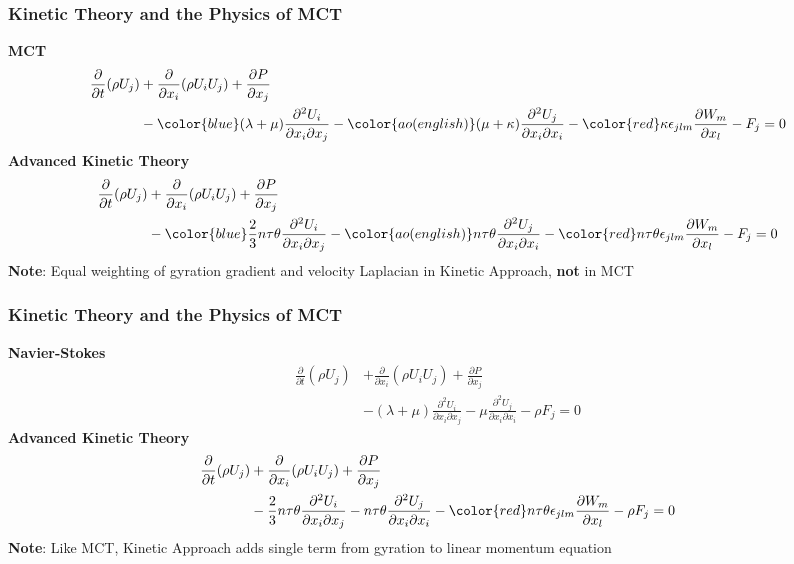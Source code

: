\documentclass{beamer}
\begin{document}
\begin{frame}
 \frametitle{Kinetic Theory and the Physics of MCT}
 \textbf{MCT}
 \begin{align*}
\frac{\partial}{\partial t}(\rho U_j)  &+ \frac{\partial}{\partial x_i}(\rho 
U_iU_j) + \frac{\partial P}{\partial x_j} \\ &- {\color{blue}(\lambda + 
\mu)\frac{\partial^2 U_i}{\partial x_i \partial x_j}} - 
{\color{ao(english)}(\mu + 
\kappa)\frac{\partial^2 U_j}{\partial x_i\partial x_i}} - {\color{red}\kappa 
\epsilon_{jlm}\frac{\partial W_m}{\partial x_l}} - F_{j} = 0
\end{align*}
\textbf{Advanced Kinetic Theory}
\begin{align*}
\frac{\partial}{\partial t}(\rho U_j)  &+ \frac{\partial}{\partial x_i}(\rho 
U_iU_j) + \frac{\partial P}{\partial x_j} \\ 
&- {\color{blue}\frac{2}{3}n\tau\theta\frac{\partial^2 U_i}{\partial x_i 
\partial x_j}} - {\color{ao(english)}n\tau\theta \frac{\partial^2 U_j}{\partial 
x_i \partial x_i}} -  {\color{red}n\tau\theta\epsilon_{jlm}\frac{\partial 
W_m}{\partial x_l}} - F_{j} = 0
\end{align*}
\pause
\textbf{Note}: Equal weighting of gyration gradient and velocity Laplacian in 
Kinetic Approach, \textbf{not} in MCT
\end{frame}

\begin{frame}
\frametitle{Kinetic Theory and the Physics of MCT}
 \textbf{Navier-Stokes}
\begin{align*}
\frac{\partial}{\partial t}(\rho U_j)  &+ \frac{\partial}{\partial x_i}(\rho 
U_iU_j) + \frac{\partial P}{\partial x_j} \\ &- (\lambda + 
\mu)\frac{\partial^2 U_i}{\partial x_i \partial x_j} - \mu\frac{\partial^2 
U_j}{\partial x_i\partial x_i} - \rho F_{j} = 0
\end{align*}
\textbf{Advanced Kinetic Theory}
\begin{align*}
\frac{\partial}{\partial t}(\rho U_j)  &+ \frac{\partial}{\partial x_i}(\rho 
U_iU_j) + \frac{\partial P}{\partial x_j} \\ 
&- \frac{2}{3}n\tau\theta\frac{\partial^2 U_i}{\partial x_i 
\partial x_j} - n\tau\theta \frac{\partial^2 
U_j}{\partial x_i \partial x_i} -  
{\color{red}n\tau\theta\epsilon_{jlm}\frac{\partial W_m}{\partial x_l}} - 
\rho F_{j} 
= 0
\end{align*}
\textbf{Note}: Like MCT, Kinetic Approach adds single term from gyration to 
linear momentum equation
\end{frame}
\end{document}
